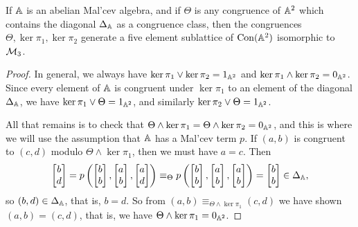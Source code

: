 \documentclass[letterpaper,11pt]{article}
\DeclareMathOperator{\Con}{Con}
\begin{document}
\begin{thm}\label{abelian-M3} If $\mathbb{A}$ is an abelian Mal'cev algebra, and if $\Theta$ is any congruence of $\mathbb{A}^2$ which contains the diagonal $\Delta_{\mathbb{A}}$ as a congruence class, then the congruences $\Theta, \ker \pi_1, \ker \pi_2$ generate a five element sublattice of $\Con(\bA^2)$ isomorphic to $\mathcal{M}_3$.
\end{thm}
\begin{proof} In general, we always have $\ker \pi_1 \vee \ker \pi_2 = 1_{\mathbb{A}^2}$ and $\ker \pi_1 \wedge \ker \pi_2 = 0_{\mathbb{A}^2}$. Since every element of $\mathbb{A}$ is congruent under $\ker \pi_1$ to an element of the diagonal $\Delta_{\mathbb{A}}$, we have $\ker \pi_1 \vee \Theta = 1_{\mathbb{A}^2}$, and similarly $\ker \pi_2 \vee \Theta = 1_{\mathbb{A}^2}$.

All that remains is to check that $\Theta \wedge \ker \pi_1 = \Theta\wedge \ker \pi_2 = 0_{\mathbb{A}^2}$, and this is where we will use the assumption that $\mathbb{A}$ has a Mal'cev term $p$. If $(a,b)$ is congruent to $(c,d)$ modulo $\Theta \wedge \ker \pi_1$, then we must have $a = c$. Then 
\[
\begin{bmatrix} b\\ d\end{bmatrix} = p\left(\begin{bmatrix} b\\ b\end{bmatrix}, \begin{bmatrix} a\\ b\end{bmatrix}, \begin{bmatrix} a\\ d\end{bmatrix}\right) \equiv_\Theta p\left(\begin{bmatrix} b\\ b\end{bmatrix}, \begin{bmatrix} a\\ b\end{bmatrix}, \begin{bmatrix} a\\ b\end{bmatrix}\right) = \begin{bmatrix} b\\ b\end{bmatrix} \in \Delta_{\mathbb{A}},
\]
so $(b,d) \in \Delta_{\mathbb{A}}$, that is, $b = d$. So from $(a,b) \equiv_{\Theta \wedge \ker \pi_1} (c,d)$ we have shown $(a,b) = (c,d)$, that is, we have $\Theta \wedge \ker \pi_1 = 0_{\mathbb{A}^2}$.
\end{proof}
\end{document}
